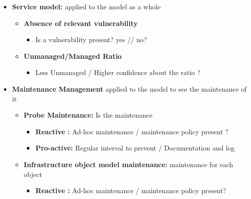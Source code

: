 \documentclass[12pt]{report}
\begin{document}
\begin{itemize}
	\item \textbf{Service model:} applied to the model as a whole\par

\begin{itemize}
	\item \textbf{ Absence of relevant vulnerability   }\par

\begin{itemize}
	\item Is a vulnerability present? yes // no?\par


\end{itemize}
	\item \textbf{Unmanaged/Managed Ratio}\par

\begin{itemize}
	\item Less Unmanaged / Higher confidence about the ratio ? \par
\end{itemize}
\end{itemize}
	\item \textbf{Maintenance Management } applied to the model to see the maintenance of it \par

\begin{itemize}
	\item \textbf{Probe Maintenance:} Is the maintenance \par

\begin{itemize}
	\item \textbf{Reactive :}  Ad-hoc maintenance / maintenance policy  present ? \par

	\item \textbf{Pro-active:} Regular interval to prevent / Documentation and log \par


\end{itemize}
	\item  \textbf{Infrastructure object model maintenance: } maintenance for each object  \par

\begin{itemize}
	\item \textbf{Reactive :}  Ad-hoc maintenance / maintenance policy present?   \par


\end{itemize}
\end{itemize}
\end{itemize}
\end{document}
